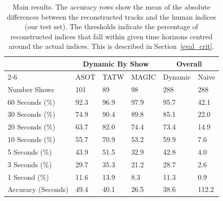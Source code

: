 \documentclass[twocolumn]{article}
\begin{document}
\begin{table}[f]
\centering
\caption {Main results. The accuracy rows show the mean of the absolute differences between the reconstructed tracks and the human indices (our test set). The thresholds indicate the percentage of reconstructed indices that fall within given time horizons centred around the actual indices. This is described in Section~\ref{eval_crit}.} \label{tab:mainresults} 
\vspace{1em}
{\setlength{\extrarowheight}{1.0pt}
\begin{tabular}{|l|l|l|l|l|l|}
\hline 
& \multicolumn{3}{c|}{\textbf{Dynamic By Show}}&  \multicolumn{2}{c|}{\textbf{Overall}}\\
\cline{2-6}
\multicolumn{1}{|>{\bf}l|}{}& {ASOT}& {TATW}& {MAGIC}& {Dynamic}& \multicolumn{1}{l|}{{Naive}}\\
 \hline 
\multicolumn{1}{|l|}{Number Shows}& 101& 89& 98& 288& \multicolumn{1}{l|}{288}\\
\hline 
\multicolumn{1}{|l|}{ 60 Seconds (\%) }& 92.3& 96.9& 97.9& 95.7& \multicolumn{1}{l|}{42.1}\\
\hline 
\multicolumn{1}{|l|}{ 30 Seconds (\%) }& 74.9& 90.4& 89.8& 85.1& \multicolumn{1}{l|}{22.0}\\
\hline 
\multicolumn{1}{|l|}{ 20 Seconds (\%) }& 63.7& 82.0& 74.4& 73.4& \multicolumn{1}{l|}{14.9}\\
\hline 
\multicolumn{1}{|l|}{ 10 Seconds (\%) }& 55.7& 70.9& 53.2& 59.9& \multicolumn{1}{l|}{7.6}\\
\hline 
\multicolumn{1}{|l|}{ 5 Seconds (\%) }& 43.9& 51.5& 32.9& 42.8& \multicolumn{1}{l|}{4.0}\\
\hline 
\multicolumn{1}{|l|}{ 3 Seconds (\%) }& 29.7& 35.3& 21.2& 28.7& \multicolumn{1}{l|}{2.6}\\
\hline 
\multicolumn{1}{|l|}{ 1 Second (\%) }& 11.6& 13.9& 8.3& 11.3& \multicolumn{1}{l|}{0.9}\\
\hline 
\multicolumn{1}{|l|}{Accuracy (Seconds)}& 49.4& 40.1& 26.5& 38.6& \multicolumn{1}{l|}{112.2}\\
\hline 
\end{tabular}}

\end{table}
\end{document}

